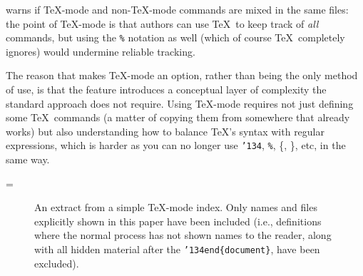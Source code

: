 \documentclass[prodmode,acmtecs]{acmsmall} %
\begin{document}
 warns if \TeX-mode and non-\TeX-mode commands are mixed in the same files: the point of \TeX-mode is that authors can use \TeX\ to keep track of \emph{all\/}  commands, but using the \texttt{\%}  notation as well (which of course \TeX\ completely ignores) would undermine reliable tracking.

The reason that  makes \TeX-mode an option, rather than being the only method of use, is that the feature introduces a conceptual layer of complexity the standard approach does not require. Using \TeX-mode requires not just defining some \TeX\ commands (a matter of copying them from somewhere that already works) but also understanding how to balance \TeX's syntax with regular expressions, which is harder as you can no longer use {\tt \char'134}, {\tt \%}, \{, \}, etc, in the same way. 

{\def\thefootnote{\lower 1ex\hbox{*}}
=\hbox{\footnotemark\relax}
\begin{figure}
\renewenvironment{theindex}{\begin{list}{\relax}{}\item \hskip0pt \vdots}{\item \hskip0pt \vdots\end{list}}
\begin{center}\small
{}
\end{center}
\caption{An extract from a simple  \TeX-mode index. Only names and files explicitly shown in this paper have been included (i.e., definitions where the normal  process has not shown names to the reader, along with all hidden material after the {\tt \char'134end\{document\}}, have been excluded).}
\label{fig:index}
\end{figure}
}
\end{document}
